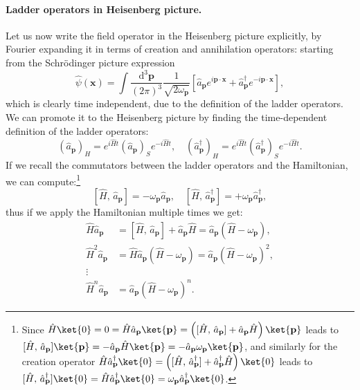 \paragraph{Ladder operators in Heisenberg picture.} Let us now write the field operator in the Heisenberg picture explicitly, by Fourier expanding it in terms of creation and annihilation operators: starting from the Schrödinger picture expression
\[
    \hat{\psi} (\mathbf{x}) = \int \frac{\mathrm{d}^3 \mathbf{p}}{(2\pi)^3} \frac{1}{\sqrt{2\omega_{\mathbf{p}}}} \left[ \hat{a}_{\mathbf{p}} e^{i \mathbf{p} \cdot \mathbf{x}} + \hat{a}^{\dagger}_{\mathbf{p}} e^{-i \mathbf{p} \cdot \mathbf{x}} \right],
\]
which is clearly time independent, due to the definition of the ladder operators. We can promote it to the Heisenberg picture by finding the time-dependent definition of the ladder operators:
\[
    \left(\hat{a}_{\mathbf{p}}\right)_H = e^{i \hat{H} t} (\hat{a}_{\mathbf{p}})_S e^{-i \hat{H} t}, \quad \left(\hat{a}^{\dagger}_{\mathbf{p}}\right)_H = e^{i \hat{H} t} (\hat{a}^{\dagger}_{\mathbf{p}})_S e^{-i \hat{H} t}.
\]
If we recall the commutators between the ladder operators and the Hamiltonian, we can compute:\footnote{Since \(\hat{H}\ket{0} = 0 = \hat{H} \hat{a}_{\mathbf{p}}\ket{\mathbf{p}} = \left([\hat{H} ,\, \hat{a}_{\mathbf{p}}] + \hat{a}_{\mathbf{p}}\hat{H}\right)\ket{\mathbf{p}}\) leads to \([\hat{H},\, \hat{a}_{\mathbf{p}}]\ket{\mathbf{p}} = -\hat{a}_{\mathbf{p}}\hat{H} \ket{\mathbf{p}} = -\hat{a}_{\mathbf{p}} \omega_{\mathbf{p}} \ket{\mathbf{p}}\), and similarly for the creation operator \(\hat{H} \hat{a}^{\dagger}_{\mathbf{p}} \ket{0} = \left([\hat{H},\,\hat{a}^{\dagger}_{\mathbf{p}}] + \hat{a}^{\dagger}_{\mathbf{p}} \hat{H} \right) \ket{0}\) leads to \([\hat{H},\,\hat{a}^{\dagger}_{\mathbf{p}}] \ket{0} = \hat{H} \hat{a}^{\dagger}_{\mathbf{p}} \ket{0} = \omega_{\mathbf{p}} \hat{a}^{\dagger}_{\mathbf{p}} \ket{0}\).}
\[
    [\hat{H},\, \hat{a}_{\mathbf{p}}] = - \omega_{\mathbf{p}} \hat{a}_{\mathbf{p}}, \quad [\hat{H},\, \hat{a}^{\dagger}_{\mathbf{p}}] = + \omega_{\mathbf{p}} \hat{a}^{\dagger}_{\mathbf{p}},
\]
thus if we apply the Hamiltonian multiple times we get:
\[
    \begin{aligned}
        \hat{H} \hat{a}_{\mathbf{p}}   & = [\hat{H},\, \hat{a}_{\mathbf{p}}] + \hat{a}_{\mathbf{p}} \hat{H} = \hat{a}_{\mathbf{p}}\left(\hat{H} - \omega_{\mathbf{p}}\right),         \\
        \hat{H}^2 \hat{a}_{\mathbf{p}} & = \hat{H} \hat{a}_{\mathbf{p}} \left(\hat{H} - \omega_{\mathbf{p}}\right)= \hat{a}_{\mathbf{p}}\left(\hat{H} - \omega_{\mathbf{p}}\right)^2, \\
        \vdots                         &                                                                                                                                              \\
        \hat{H}^n \hat{a}_{\mathbf{p}} & = \hat{a}_{\mathbf{p}}\left(\hat{H} - \omega_{\mathbf{p}}\right)^n.
    \end{aligned}
\]
